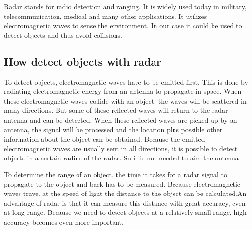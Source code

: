 \documentclass{article}
\begin{document}
Radar stands for radio detection and ranging. It is widely used today in military, telecommunication, medical and many other applications. It utilizes electromagnetic waves to sense the environment. In our case it could be used to detect objects and thus avoid collisions.

\subsection{How detect objects with radar}

To detect objects, electromagnetic waves have to be emitted first. This is done by radiating electromagnetic energy from an antenna to propagate in space. When these electromagnetic waves collide with an object, the waves will be scattered in many directions. But some of these reflected waves will return to the radar antenna and can be detected. When these reflected waves are picked up by an antenna, the signal will be processed and the location plus possible other information about the object can be obtained. Because the emitted electromagnetic waves are usually sent in all directions, it is possible to detect objects in a certain radius of the radar. So it is not needed to aim the antenna

To determine the range of an object, the time it takes for a radar signal to propagate to the object and back has to be measured. Because electromagnetic waves travel at the speed of light the distance to the object can be calculated.An advantage of radar is that it can measure this distance with great accuracy, even at long range. Because we need to detect objects at a relatively small range, high accuracy becomes even more important.
\end{document}
